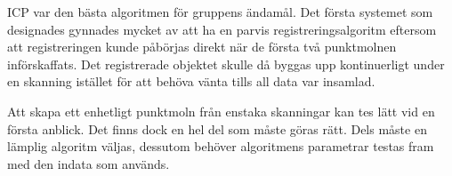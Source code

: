 ICP var den bästa algoritmen för gruppens ändamål. Det första systemet som designades gynnades mycket av att ha en parvis registreringsalgoritm eftersom att registreringen kunde påbörjas direkt när de första två punktmolnen införskaffats. Det registrerade objektet skulle då byggas upp kontinuerligt under en skanning istället för att behöva vänta tills all data var insamlad.

Att skapa ett enhetligt punktmoln från enstaka skanningar kan tes lätt vid en första anblick. Det finns dock en hel del som måste göras rätt. Dels måste en lämplig algoritm väljas, dessutom behöver algoritmens parametrar testas fram med den indata som används. 


